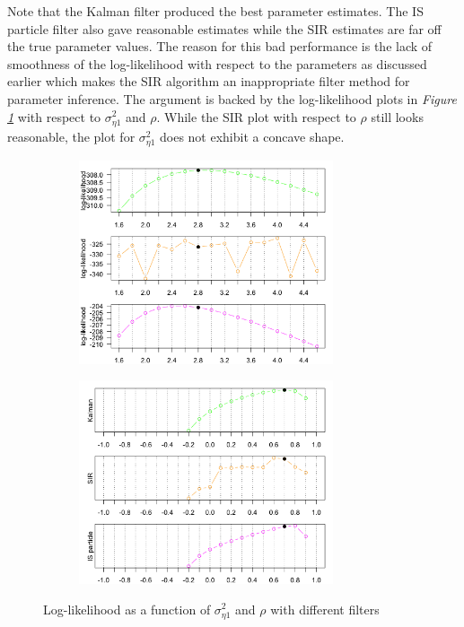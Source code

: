 \documentclass[11pt, oneside]{scrreprt}   	%
\begin{document}
Note that the Kalman filter produced the best parameter estimates. The IS particle filter also gave reasonable estimates while the SIR estimates are far off the true parameter values. The reason for this bad performance is the lack of smoothness of the log-likelihood with respect to the parameters as discussed earlier which makes the SIR algorithm an inappropriate filter method for parameter inference. The argument is backed by the log-likelihood plots in \textit{Figure \ref{fig:mllm_loglik}} with respect to $\sigma_{\eta 1}^2$ and $\rho$. While the SIR plot with respect to $\rho$ still looks reasonable, the plot for $\sigma_{\eta 1}^2$ does not exhibit a concave shape.\\

\begin{figure}[h!]
\centering
\begin{subfigure}{.5\textwidth}
  \centering
  \includegraphics[width=75mm]{../../images/mllm-loglik-var2.png}
\end{subfigure}%
\begin{subfigure}{.5\textwidth}
  \centering
  \includegraphics[width=75mm]{../../images/mllm-loglik-rho.png}
\end{subfigure}
\caption{Log-likelihood as a function of $\sigma_{\eta 1}^2$ and $\rho$ with different filters}
\label{fig:mllm_loglik}
\end{figure}
\end{document}
